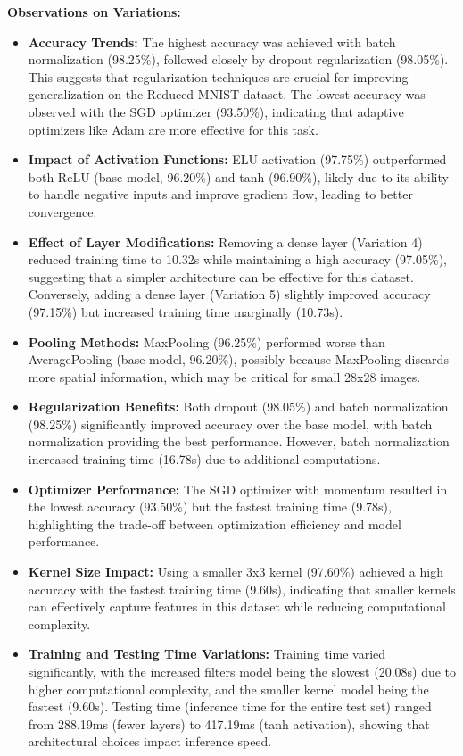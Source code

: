 \documentclass[a4paper,12pt]{article}
\begin{document}
\textbf{Observations on Variations:}
\begin{itemize}
    \item \textbf{Accuracy Trends:} The highest accuracy was achieved with batch normalization (98.25\%), followed closely by dropout regularization (98.05\%). This suggests that regularization techniques are crucial for improving generalization on the Reduced MNIST dataset. The lowest accuracy was observed with the SGD optimizer (93.50\%), indicating that adaptive optimizers like Adam are more effective for this task.
    \item \textbf{Impact of Activation Functions:} ELU activation (97.75\%) outperformed both ReLU (base model, 96.20\%) and tanh (96.90\%), likely due to its ability to handle negative inputs and improve gradient flow, leading to better convergence.
    \item \textbf{Effect of Layer Modifications:} Removing a dense layer (Variation 4) reduced training time to 10.32s while maintaining a high accuracy (97.05\%), suggesting that a simpler architecture can be effective for this dataset. Conversely, adding a dense layer (Variation 5) slightly improved accuracy (97.15\%) but increased training time marginally (10.73s).
    \item \textbf{Pooling Methods:} MaxPooling (96.25\%) performed worse than AveragePooling (base model, 96.20\%), possibly because MaxPooling discards more spatial information, which may be critical for small 28x28 images.
    \item \textbf{Regularization Benefits:} Both dropout (98.05\%) and batch normalization (98.25\%) significantly improved accuracy over the base model, with batch normalization providing the best performance. However, batch normalization increased training time (16.78s) due to additional computations.
    \item \textbf{Optimizer Performance:} The SGD optimizer with momentum resulted in the lowest accuracy (93.50\%) but the fastest training time (9.78s), highlighting the trade-off between optimization efficiency and model performance.
    \item \textbf{Kernel Size Impact:} Using a smaller 3x3 kernel (97.60\%) achieved a high accuracy with the fastest training time (9.60s), indicating that smaller kernels can effectively capture features in this dataset while reducing computational complexity.
    \item \textbf{Training and Testing Time Variations:} Training time varied significantly, with the increased filters model being the slowest (20.08s) due to higher computational complexity, and the smaller kernel model being the fastest (9.60s). Testing time (inference time for the entire test set) ranged from 288.19ms (fewer layers) to 417.19ms (tanh activation), showing that architectural choices impact inference speed.
\end{itemize}
\newpage
\end{document}
